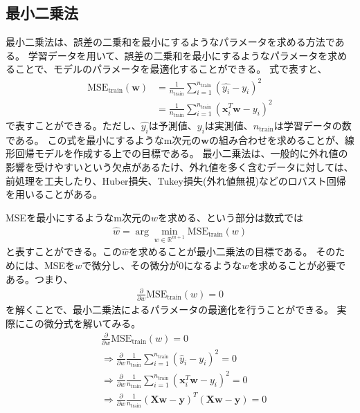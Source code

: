 \documentclass{ltjsarticle}
\begin{document}
\newpage

\subsection{最小二乗法}
最小二乗法は、誤差の二乗和を最小にするようなパラメータを求める方法である。
学習データを用いて、誤差の二乗和を最小にするようなパラメータを求めることで、モデルのパラメータを最適化することができる。
式で表すと、
\begin{align}
  \text{MSE}_{\text{train}}(\boldsymbol{w}) &= \frac{1}{n_\text{train}}\sum_{i=1}^{n_\text{train}}(\hat{y_i} - y_i)^2\\
  &= \frac{1}{n_\text{train}}\sum_{i=1}^{n_\text{train}}(\boldsymbol{x}^T_i \boldsymbol{w} - y_i)^2
\end{align}
で表すことができる。ただし、$\hat{y_i}$は予測値、$y_i$は実測値、$n_\text{train}$は学習データの数である。
この式を最小にするようなm次元の$\boldsymbol{w}$の組み合わせを求めることが、線形回帰モデルを作成する上での目標である。
最小二乗法は、一般的に外れ値の影響を受けやすいという欠点があるたけ、外れ値を多く含むデータに対しては、前処理を工夫したり、Huber損失、Tukey損失(外れ値無視)などのロバスト回帰を用いることがある。
\par
MSEを最小にするようなm次元の$w$を求める、という部分は数式では
\begin{align}
  \hat{w} = \arg\min_{w\in \mathbb{R}^{m+1}}\text{MSE}_{\text{train}}(w)
\end{align}
と表すことができる。この$\hat{w}$を求めることが最小二乗法の目標である。
そのためには、MSEを$w$で微分し、その微分が0になるような$w$を求めることが必要である。つまり、
\begin{align}
  \frac{\partial}{\partial w}\text{MSE}_{\text{train}}(w) = 0
\end{align}
を解くことで、最小二乗法によるパラメータの最適化を行うことができる。
\iffalse
実際にこの微分式を解いてみる。
\begin{align}
  & \frac{\partial}{\partial w}\text{MSE}_{\text{train}}(w) = 0\\
  &\Rightarrow \frac{\partial}{\partial w} { \frac{1}{n_{\text{train}}} \sum_{i=1}^{n_{\text{train}}} (\hat{y}_i - y_i)^2 } = 0\\
  &\Rightarrow \frac{\partial}{\partial w}{ \frac{1}{n_\text{train}}\sum_{i=1}^{n_\text{train}}(\boldsymbol{x}^T_i \boldsymbol{w} - y_i)^2} = 0\\
  &\Rightarrow \frac{\partial}{\partial w}{ \frac{1}{n_\text{train}} (\boldsymbol{X}\boldsymbol{w} - \boldsymbol{y})^T (\boldsymbol{X}\boldsymbol{w} - \boldsymbol{y})} = 0
\end{align}
\end{document}
